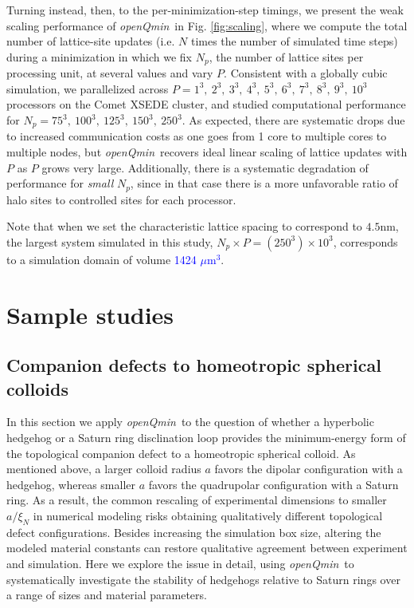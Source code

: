 \documentclass[utf8]{frontiersFPHY} %
\newcommand{\DAB}[1]{\textcolor{blue}{#1}}
\def\PackageName{\textit{openQmin}}
\begin{document}
Turning instead, then, to the per-minimization-step timings, we present the weak scaling performance of \PackageName\  in Fig. \ref{fig:scaling}, where we compute the total number of lattice-site updates (i.e. $N$ times the number of simulated time steps) during a minimization in which we fix $N_p$, the number of lattice sites per processing unit, at several values and vary $P$. Consistent with a globally cubic simulation, we parallelized across $P=1^3,\ 2^3,\ 3^3,\ 4^3,\ 5^3,\ 6^3,\ 7^3,\ 8^3,\ 9^3,\ 10^3$ processors on the Comet XSEDE cluster, and studied computational performance for $N_p=75^3,\ 100^3,\ 125^3,\ 150^3,\ 250^3$. As expected, there are systematic drops due to increased communication costs as one goes from 1 core to multiple cores to multiple nodes, but \PackageName\  recovers ideal linear scaling of lattice updates with $P$ as $P$ grows very large. Additionally, there is a systematic degradation of performance for \emph{small} $N_p$, since in that case there is a more unfavorable ratio of halo sites to controlled sites for each processor. 

Note that when we set the characteristic lattice spacing to correspond to $4.5$nm, the largest system simulated in this study, $N_p\times P = (250^3)\times10^3$, corresponds to a simulation domain of volume \DAB{1424 $\mu$m$^3$}. %

\section{Sample studies} \label{sec:SampleStudy}

\subsection{Companion defects to homeotropic spherical colloids}
In this section we apply \PackageName\ to the question of whether a hyperbolic hedgehog or a Saturn ring disclination loop provides the minimum-energy form of the topological companion defect to a homeotropic spherical colloid. As mentioned above, a larger colloid radius $a$ favors the dipolar configuration with a hedgehog, whereas smaller $a$ favors the quadrupolar configuration with a Saturn ring. As a result, the common rescaling of experimental dimensions to smaller $a/\xi_N$ in numerical modeling risks obtaining qualitatively different topological defect configurations. Besides increasing the simulation box size, altering the modeled material constants can restore qualitative agreement between experiment and simulation.  Here we explore the issue in detail, using \PackageName\ to systematically investigate the stability of hedgehogs relative to Saturn rings over a range of sizes and material parameters. 
\end{document}

